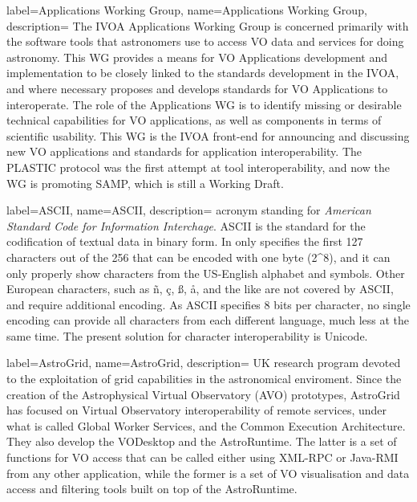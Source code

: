 {
    label={Applications Working Group},
    name={Applications Working Group},
    description={
    	The \gls{IVOA} Applications Working Group is concerned
        primarily with the software tools that astronomers use to
        access VO data and services for doing astronomy. This WG
        provides a means for VO Applications development and
        implementation to be closely linked to the standards
        development in the IVOA, and where necessary proposes and
        develops standards for VO Applications to interoperate. The
        role of the Applications WG is to identify missing or desirable
        technical capabilities for VO applications, as well as
        components in terms of scientific usability. This WG is the
        IVOA front-end for announcing and discussing new VO
        applications and standards for application interoperability.
        The \gls{PLASTIC} protocol was the first attempt at tool
        interoperability, and now the WG is promoting \gls{SAMP},
        which is still a \gls{Working Draft}.
    }
}

{
    label={ASCII},
    name={ASCII},
    description={
    	acronym standing for \emph{American Standard Code for
        Information Interchage}. ASCII is the standard for the
        codification of textual data in binary form. In only specifies
        the first 127 characters out of the 256 that can be encoded
        with one byte (2^8), and it can only properly show characters
        from the US-English alphabet and symbols. Other European
        characters, such as ñ, ç, ß, å, and the like are not covered by
        ASCII, and require additional encoding. As ASCII specifies 8
        bits per character, no single encoding can provide all
        characters from each different language, much less at the same
        time. The present solution for character interoperability is
        \gls{Unicode}.
    }
}

{
    label={AstroGrid},
    name={AstroGrid},
    description={
    	UK research program devoted to the exploitation of grid
        capabilities in the astronomical enviroment. Since the creation
        of the Astrophysical Virtual Observatory (AVO) prototypes,
        AstroGrid has focused on \gls{Virtual Observatory}
        interoperability of remote services, under what is called
        Global Worker Services, and the Common Execution Architecture.
        They also develop the VODesktop and the AstroRuntime. The
        latter is a set of functions for VO access that can be called
        either using \gls{XML-RPC} or \gls{Java-RMI} from any
        other application, while the former is a set of VO
        visualisation and data access and filtering tools built on top
        of the \gls{AstroRuntime}.
    }
}

